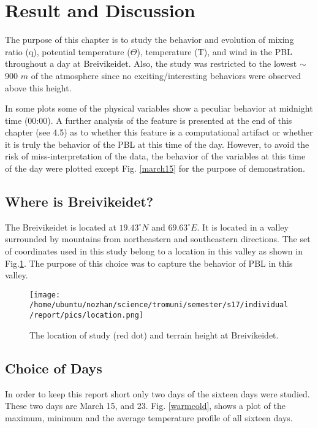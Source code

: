 \documentclass[a4paper,12pt]{article}
\numberwithin{equation}{section} %
\begin{document}
\newpage

\section{Result and Discussion}

The purpose of this chapter is to study the behavior and evolution of mixing ratio (q), potential temperature ($\Theta$), temperature (T), and wind in the PBL throughout a day at Breivikeidet. Also, the study was restricted to the lowest $\sim$ 900 $m$ of the atmosphere since no exciting/interesting behaviors were observed above this height.

In some plots some of the physical variables show a peculiar behavior at midnight time (00:00). A further analysis of the feature is presented at the end of this chapter (see 4.5) as to whether this feature is a computational artifact or whether it is truly the behavior of the PBL at this time of the day. However, to avoid the risk of miss-interpretation of the data, the behavior of the variables at this time of the day were plotted except Fig. \ref{march15} for the purpose of demonstration.

\subsection{Where is Breivikeidet?}

The Breivikeidet is located at $19.43^\circ N$ and $69.63^\circ E$. It is located in a valley surrounded by mountains from northeastern and southeastern directions. The set of coordinates used in this study belong to a location in this valley as shown in Fig.\ref{location}. The purpose of this choice was to capture the behavior of PBL in this valley.

\begin{figure}[bhp]
\texttt{[image: /home/ubuntu/nozhan/science/tromuni/semester/s17/individual/report/pics/location.png]}
\caption{The location of study (red dot) and terrain height at Breivikeidet.}
\label{location}
\end{figure}

\subsection{Choice of Days}
In order to keep this report short only two days of the sixteen days were studied. These two days are March 15, and 23. Fig. \ref{warmcold}, shows a plot of the maximum, minimum and the average temperature profile of all sixteen days.
\end{document}
